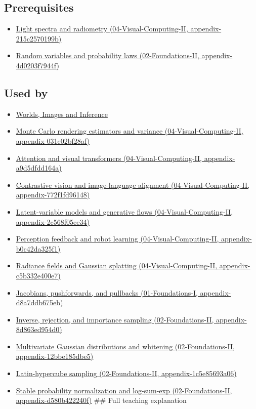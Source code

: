 \subsection{Prerequisites}\label{prerequisites}

\begin{itemize}
\tightlist
\item
  \href{}{Light spectra and radiometry (04-Visual-Computing-II, appendix-215c2570199b)}
\item
  \href{}{Random variables and probability laws (02-Foundations-II, appendix-4d0203f7944f)}
\end{itemize}

\subsection{Used by}\label{used-by}

\begin{itemize}
\item
  \href{Continuous\%20Notes/University\%20-\%20Worlds,\%20Images\%20and\%20Inference\%20-\%20Graphics,\%20Vision\%20and\%20Photography}{Worlds, Images and Inference}
\item
  \href{}{Monte Carlo rendering estimators and variance (04-Visual-Computing-II, appendix-031e02bf28af)}
\item
  \href{}{Attention and visual transformers (04-Visual-Computing-II, appendix-a9d5dfdd164a)}
\item
  \href{}{Contrastive vision and image-language alignment (04-Visual-Computing-II, appendix-772f1fd96148)}
\item
  \href{}{Latent-variable models and generative flows (04-Visual-Computing-II, appendix-2c568f05ee34)}
\item
  \href{}{Perception feedback and robot learning (04-Visual-Computing-II, appendix-b0c42da325f1)}
\item
  \href{}{Radiance fields and Gaussian splatting (04-Visual-Computing-II, appendix-c5b332e400e7)}
\item
  \href{}{Jacobians, pushforwards, and pullbacks (01-Foundations-I, appendix-d8a7ddb675eb)}
\item
  \href{}{Inverse, rejection, and importance sampling (02-Foundations-II, appendix-8d863ed954d0)}
\item
  \href{}{Multivariate Gaussian distributions and whitening (02-Foundations-II, appendix-12bbe185dbe5)}
\item
  \href{}{Latin-hypercube sampling (02-Foundations-II, appendix-1c5e85693a06)}
\item
  \href{}{Stable probability normalization and log-sum-exp (02-Foundations-II, appendix-d580b422240f)} \#\# Full teaching explanation
\end{itemize}

